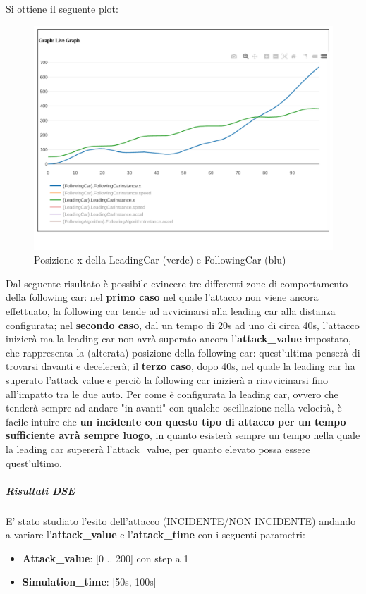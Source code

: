 Si ottiene il seguente plot:
\begin{figure}[H]
	\centering
	\includegraphics[width=\textwidth]{img/AttackXSimulation.png}
	\caption{Posizione x della LeadingCar (verde) e FollowingCar (blu)}
\end{figure}
Dal seguente risultato è possibile evincere tre differenti zone di comportamento della following car: nel \textbf{primo caso} nel quale l'attacco non viene ancora effettuato, la following car tende ad avvicinarsi alla leading car alla distanza configurata; nel \textbf{secondo caso}, dal un tempo di 20s ad uno di circa 40s, l'attacco inizierà ma la leading car non avrà superato ancora l'\textbf{attack\_value} impostato, che rappresenta la (alterata) posizione della following car: quest'ultima penserà di trovarsi davanti e decelererà; il \textbf{terzo caso}, dopo 40s, nel quale la leading car ha superato l'attack value e perciò la following car inizierà a riavvicinarsi fino all'impatto tra le due auto.
Per come è configurata la leading car, ovvero che tenderà sempre ad andare "in avanti" con qualche oscillazione nella velocità, è facile intuire che \textbf{un incidente con questo tipo di attacco per un tempo sufficiente avrà sempre luogo}, in quanto esisterà sempre un tempo nella quale la leading car supererà l'attack\_value, per quanto elevato possa essere quest'ultimo.  
\subparagraph{Risultati DSE}
E' stato studiato l'esito dell'attacco (INCIDENTE/NON INCIDENTE) andando a variare l'\textbf{attack\_value} e l'\textbf{attack\_time} con i seguenti parametri:
\begin{itemize}
	\item \textbf{Attack\_value}: [0 .. 200] con step a 1
	\item \textbf{Simulation\_time}: [50s, 100s]
\end{itemize}
 
